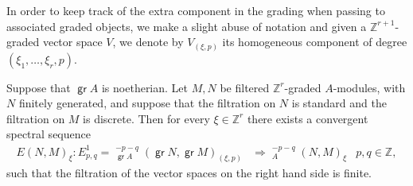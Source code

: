 \documentclass[11pt,fleqn]{article}
\newcommand\ZZ{\mathbb Z}
\DeclareMathOperator\GrExt{\underline{\mathsf{Ext}}}
\DeclareMathOperator\gr{\mathsf{gr}}
\begin{document}
In order to keep track of the extra component in the grading when passing to associated 
graded objects, we make a slight abuse of notation and given a $\ZZ^{r+1}$-graded vector 
space $V$, we denote by $V_{(\xi, p)}$ its homogeneous component of degree $(\xi_1, 
\ldots, \xi_r, p)$.

\begin{Proposition*} 
Suppose that $\gr A$ is noetherian.
Let $M, N$ be filtered $\ZZ^r$-graded $A$-modules, with $N$ finitely generated, and
suppose that the filtration on $N$ is standard and the filtration on $M$ is discrete. Then
for every $\xi \in \ZZ^r$ there exists a convergent spectral sequence
\begin{align*} 
	E(N,M)_\xi: E_{p,q}^1 = \GrExt_{\gr A}^{-p-q}(\gr N, \gr M)_{(\xi,p)}
		&\Rightarrow \GrExt_A^{-p-q}(N,M)_\xi 
		&p,q \in \ZZ, 
\end{align*} 
such that the filtration of the vector spaces on the right hand side is finite.
\end{Proposition*}
\end{document}
